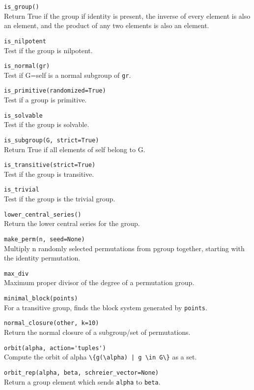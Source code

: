 \documentclass[10pt,landscape]{article}
\begin{document}
\begin{multicols}{3}
\verb!is_group()!\\
Return True if the group if identity is present, the inverse of every element is also an element, and the product of any two elements is also an element.



\verb!is_nilpotent!\\
Test if the group is nilpotent.


\verb!is_normal(gr)!\\
Test if G=self is a normal subgroup of \verb!gr!.


\verb!is_primitive(randomized=True)!\\
Test if a group is primitive.


\verb!is_solvable!\\
Test if the group is solvable.


\verb!is_subgroup(G, strict=True)!\\
Return True if all elements of self belong to G.



\verb!is_transitive(strict=True)!\\
Test if the group is transitive.


\verb!is_trivial!\\
Test if the group is the trivial group.


\verb!lower_central_series()! \\
Return the lower central series for the group.


\verb!make_perm(n, seed=None)!\\
Multiply n randomly selected permutations from pgroup together, starting with the identity permutation.



\verb!max_div!\\
Maximum proper divisor of the degree of a permutation group.



\verb!minimal_block(points)!\\
For a transitive group, finds the block system generated by \verb!points!.



\verb!normal_closure(other, k=10)!\\
Return the normal closure of a subgroup/set of permutations.


\verb!orbit(alpha, action='tuples')!\\
Compute the orbit of alpha \verb!\{g(\alpha) | g \in G\}! as a set.


\verb!orbit_rep(alpha, beta, schreier_vector=None)!\\
Return a group element which sends \verb!alpha! to \verb!beta!.



\end{multicols}
\end{document}
